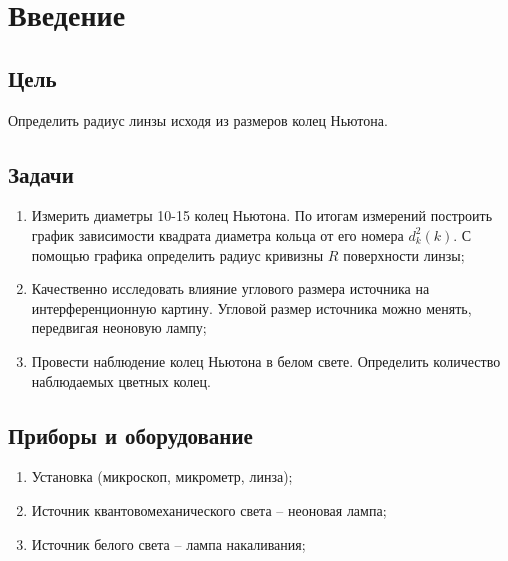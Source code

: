 \section{Введение}
\subsection*{Цель} 
Определить радиус линзы исходя из размеров колец Ньютона.

\subsection*{Задачи} 
\begin{enumerate}
	\item Измерить диаметры 10-15 колец Ньютона. По итогам измерений построить график зависимости квадрата диаметра кольца от его номера $d_k^2(k)$. С помощью графика определить радиус кривизны $R$ поверхности линзы;
	\item Качественно исследовать влияние углового размера источника на интерференционную картину. Угловой размер источника можно менять, передвигая неоновую лампу;
	\item Провести наблюдение колец Ньютона в белом свете. Определить количество наблюдаемых цветных колец.  
\end{enumerate}


\subsection*{Приборы и оборудование} 
\begin{enumerate}
	\item Установка (микроскоп, микрометр, линза);
	\item Источник квантовомеханического света -- неоновая лампа;
	\item Источник белого света -- лампа накаливания;
\end{enumerate}
